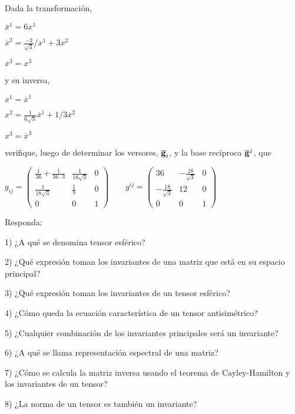 \begin{exercise}
\item

Dada la transformación, 

\bigskip

$\overline x^{1}=6 x^{1}$

\bigskip
$ \overline x^{2}=\frac{-3}{\sqrt{3}} / x^{1} + 3 x^{2}$

\bigskip

$\overline x^{3}=x^{3}$

\bigskip

y su inversa, 

\bigskip

$x^{1}=\overline x^{1}$

\bigskip

$x^{2}=    \frac{1}{6 \sqrt{3}} \overline x^{1} + 1/3 \overline x^{2}$

\bigskip

$x^{3}=\overline x^{3}$

\bigskip

\noindent
verifique, luego de  determinar los versores, $\overline{\bold{g}}_{i}$, y la base recíproca $\overline{\bold{g}}^{j}$, que 

\bigskip

$g_{ij}= \left(\begin{array}{ccc}   \frac{1}{36} + \frac{1}{36 \cdot 3}& \frac{1}{18 \sqrt{3}}& 0 \\  \frac{1}{18 \sqrt{3} } &  \frac{1}{9} & 0 \\   0 & 0 & 1
\end{array}
 \right)  \qquad   g^{ij}= \left(\begin{array}{ccc}    36 & -\frac{18}{ \sqrt{3}}& 0 \\  - \frac{18}{\sqrt{3} } &  12 & 0 \\   0 & 0 & 1
\end{array}
 \right) $
\end{exercise}


\begin{exercise}
\item

Responda:

\bigskip

1) ¿A qué se denomina tensor esférico?

2) ¿Qué expresión toman los invariantes de una matriz que está en su espacio principal?

3) ¿Qué expresión toman los invariantes de un tensor esférico? 

4) ¿Cómo queda la ecuación característica de un tensor antisimétrico?

5) ¿Cualquier combinación de los invariantes principales será un invariante?

6) ¿A qué se llama representación espectral de una matriz? 

7) ¿Cómo se calcula la matriz inversa usando el teorema de Cayley-Hamilton y los invariantes de un tensor? 

8) ¿La norma de un tensor es también un invariante?

\bigskip

\end{exercise}



